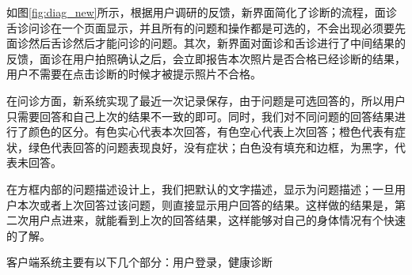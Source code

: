 如图\ref{fig:diag_new}所示，根据用户调研的反馈，新界面简化了诊断的流程，面诊舌诊问诊在一个页面显示，并且所有的问题和操作都是可选的，不会出现必须要先面诊然后舌诊然后才能问诊的问题。其次，新界面对面诊和舌诊进行了中间结果的反馈，面诊在用户拍照确认之后，会立即报告本次照片是否合格已经诊断的结果，用户不需要在点击诊断的时候才被提示照片不合格。

在问诊方面，新系统实现了最近一次记录保存，由于问题是可选回答的，所以用户只需要回答和自己上次的结果不一致的即可。同时，我们对不同问题的回答结果进行了颜色的区分。有色实心代表本次回答，有色空心代表上次回答；橙色代表有症状，绿色代表回答的问题表现良好，没有症状；白色没有填充和边框，为黑字，代表未回答。

在方框内部的问题描述设计上，我们把默认的文字描述，显示为问题描述；一旦用户本次或者上次回答过该问题，则直接显示用户回答的结果。这样做的结果是，第二次用户点进来，就能看到上次的回答结果，这样能够对自己的身体情况有个快速的了解。

客户端系统主要有以下几个部分：用户登录，健康诊断
